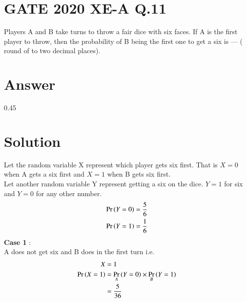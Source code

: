 \documentclass[journal,12pt,twocolumn]{IEEEtran}
\begin{document}
\section{GATE 2020 XE-A Q.11}
Players A and B take turns to throw a fair dice with six faces. If A is the first player to throw, then the probability of B being the first one to get a six is --- ( round of to two decimal places). \\

\section{Answer}
0.45
\section{Solution}
Let the random variable X represent which player gets six first. That is $X=0 $ when A gets a six first and $X=1 $ when B gets six first. \\
Let another random variable Y represent getting a six on the dice. $Y=1 $ for six and $Y=0 $ for any other number. \\
\begin{align}
    \Pr\left(Y=0\right) = \frac{5}{6} \\
    \Pr\left(Y=1\right) = \frac{1}{6}
\end{align}
\textbf{Case 1} : \\
A does not get six and B does in the first turn i.e. 
\begin{align}
    X&=1  \\
    \Pr\left(X=1\right) &= \Pr_{A}\left(Y=0\right) \times \Pr_{B}\left(Y=1\right) \\
        &= \frac{5}{36}
\end{align}
\end{document}
